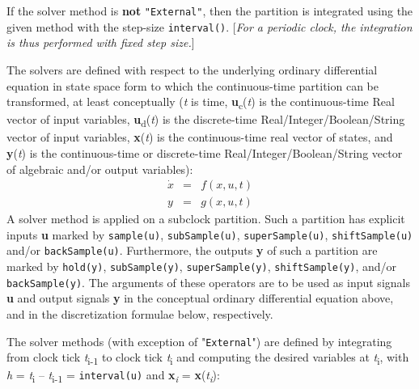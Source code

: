 If the solver method is \textbf{not} \lstinline!"External"!, then the partition is
integrated using the given method with the step-size \lstinline!interval()!.
{[}\emph{For a periodic clock, the integration is thus performed with
fixed step size.}{]}

The solvers are defined with respect to the underlying ordinary
differential equation in state space form to which the continuous-time
partition can be transformed, at least conceptually (\emph{t} is time,
\textbf{u}\textsubscript{c}(\emph{t}) is the continuous-time Real vector
of input variables, \textbf{u}\textsubscript{d}(\emph{t}) is the
discrete-time Real/Integer/Boolean/String vector of input variables,
\textbf{x}(\emph{t}) is the continuous-time real vector of states, and
\textbf{y}(\emph{t}) is the continuous-time or discrete-time
Real/Integer/Boolean/String vector of algebraic and/or output
variables):
\begin{eqnarray*}
\dot{x}&=&f(x, u, t)\\
y&=&g(x, u, t)
\end{eqnarray*}
A solver method is applied on a subclock partition. Such a partition has
explicit inputs \textbf{u} marked by \lstinline!sample(u)!,
\lstinline!subSample(u)!, \lstinline!superSample(u)!, \lstinline!shiftSample(u)!
and/or \lstinline!backSample(u)!. Furthermore, the outputs \textbf{y} of
such a partition are marked by \lstinline!hold(y)!, \lstinline!subSample(y)!,
\lstinline!superSample(y)!, \lstinline!shiftSample(y)!, and/or
\lstinline!backSample(y)!. The arguments of these operators are to be used
as input signals \textbf{u} and output signals \textbf{y} in the
conceptual ordinary differential equation above, and in the
discretization formulae below, respectively.

The solver methods (with exception of "\lstinline!External!") are defined by
integrating from clock tick \emph{t}\textsubscript{i-1} to clock tick
\emph{t}\textsubscript{i} and computing the desired variables at
\emph{t}\textsubscript{i}, with \emph{h} = \emph{t}\textsubscript{i} --
\emph{t}\textsubscript{i-1} = \lstinline!interval(u)! and
\textbf{x}\emph{\textsubscript{i}} =
\textbf{x}(\emph{t\textsubscript{i}}):

